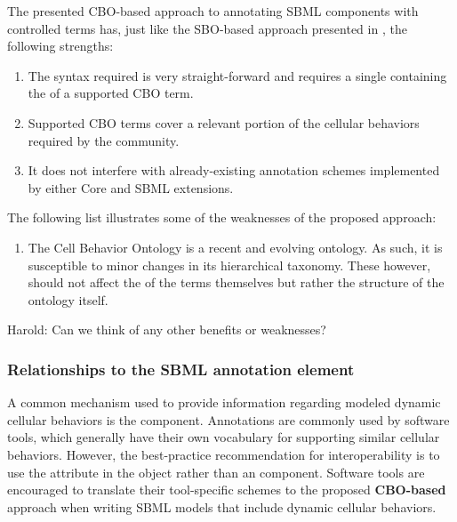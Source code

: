 The presented CBO-based approach to annotating SBML \Event components with controlled terms has, just like the SBO-based approach presented in \sbmlthreecore, the following strengths:

\begin{enumerate}
	\item The syntax required is very straight-forward and requires a single  containing the  of a supported CBO term.
	\item Supported CBO terms cover a relevant portion of the cellular behaviors required by the community.
	\item It does not interfere with already-existing annotation schemes implemented by either Core and SBML extensions.
\end{enumerate}

The following list illustrates some of the weaknesses of the proposed approach:

\begin{enumerate}
	\item The Cell Behavior Ontology is a recent and evolving ontology. As such, it is susceptible to minor changes in its hierarchical taxonomy. These however, should not affect the  of the terms themselves but rather the structure of the ontology itself.
\end{enumerate}

{\color{red} Harold: \notice Can we think of any other benefits or weaknesses?}

\subsubsection{Relationships to the SBML annotation element}
\label{subsubsec:CBO&Annot}

A common mechanism used to provide information regarding modeled dynamic cellular behaviors is the  \Annotation component. Annotations are commonly used by software tools, which generally have their own vocabulary for supporting similar cellular behaviors. However, the best-practice recommendation for interoperability is to use the  attribute in the \Event object rather than an \Annotation component. Software tools are encouraged to translate their tool-specific \Annotation schemes to the proposed \textbf{CBO-based} approach when writing SBML models that include dynamic cellular behaviors.
